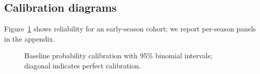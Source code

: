 \subsection{Calibration diagrams}
Figure~\ref{fig:baseline-reliability} shows reliability for an early-season cohort; we report per-season panels in the appendix.
\begin{figure}[t]
  \centering
  \caption[Baseline calibration]{Baseline probability calibration with 95\% binomial intervals; diagonal indicates perfect calibration.}
  \label{fig:baseline-reliability}
\end{figure}

